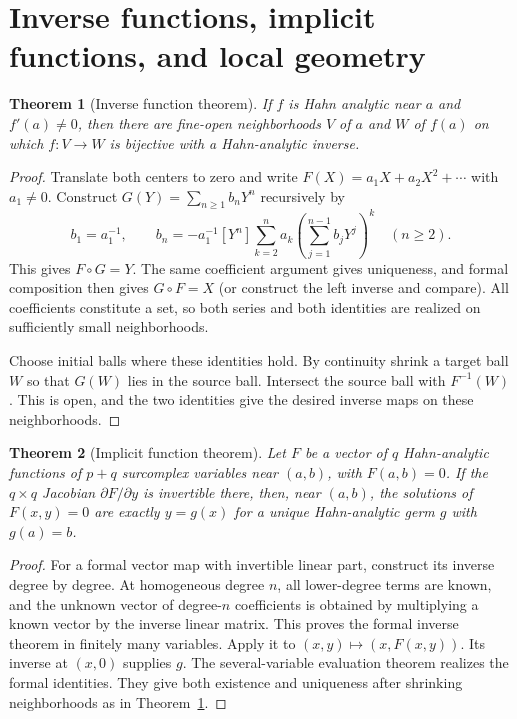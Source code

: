 \documentclass[11pt,a4paper]{article}
\newtheorem{theorem}{Theorem}[section]
\theoremstyle{definition}\newtheorem{definition}[theorem]{Definition}
\theoremstyle{remark}\newtheorem{remark}[theorem]{Remark}
\numberwithin{equation}{section}
\begin{document}
\section{Inverse functions, implicit functions, and local geometry}\label{sec:localgeometry}

\begin{theorem}[Inverse function theorem]\label{thm:inverse}
If $f$ is Hahn analytic near $a$ and $f'(a)\ne0$, then there are fine-open neighborhoods $V$ of $a$ and $W$ of $f(a)$ on which $f:V\to W$ is bijective with a Hahn-analytic inverse.
\end{theorem}
\begin{proof}
Translate both centers to zero and write $F(X)=a_1X+a_2X^2+\cdots$ with $a_1\ne0$. Construct $G(Y)=\sum_{n\geq1}b_nY^n$ recursively by
\[
 b_1=a_1^{-1},\qquad
 b_n=-a_1^{-1}[Y^n]\sum_{k=2}^{n}a_k
       \left(\sum_{j=1}^{n-1}b_jY^j\right)^k\quad(n\geq2).
\]
This gives $F\circ G=Y$. The same coefficient argument gives uniqueness, and formal composition then gives $G\circ F=X$ (or construct the left inverse and compare). All coefficients constitute a set, so both series and both identities are realized on sufficiently small neighborhoods.

Choose initial balls where these identities hold. By continuity shrink a target ball $W$ so that $G(W)$ lies in the source ball. Intersect the source ball with $F^{-1}(W)$. This is open, and the two identities give the desired inverse maps on these neighborhoods.
\end{proof}

\begin{theorem}[Implicit function theorem]\label{thm:implicit}
Let $F$ be a vector of $q$ Hahn-analytic functions of $p+q$ surcomplex variables near $(a,b)$, with $F(a,b)=0$. If the $q\times q$ Jacobian $\partial F/\partial y$ is invertible there, then, near $(a,b)$, the solutions of $F(x,y)=0$ are exactly $y=g(x)$ for a unique Hahn-analytic germ $g$ with $g(a)=b$.
\end{theorem}
\begin{proof}
For a formal vector map with invertible linear part, construct its inverse degree by degree. At homogeneous degree $n$, all lower-degree terms are known, and the unknown vector of degree-$n$ coefficients is obtained by multiplying a known vector by the inverse linear matrix. This proves the formal inverse theorem in finitely many variables. Apply it to $(x,y)\mapsto(x,F(x,y))$. Its inverse at $(x,0)$ supplies $g$. The several-variable evaluation theorem realizes the formal identities. They give both existence and uniqueness after shrinking neighborhoods as in Theorem~\ref{thm:inverse}.
\end{proof}
\end{document}
